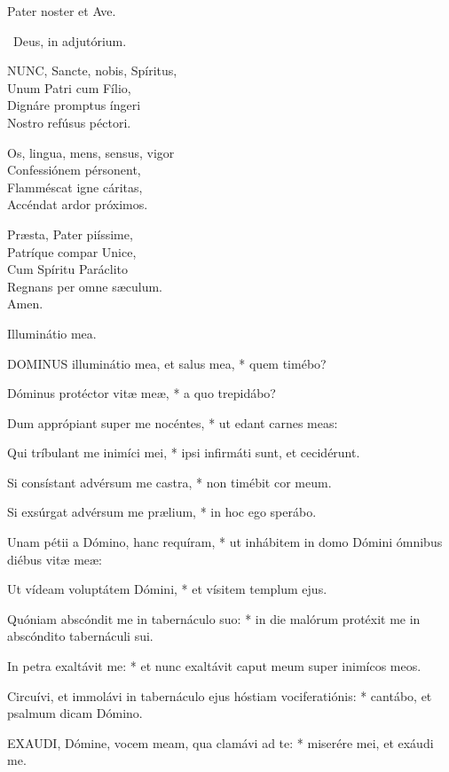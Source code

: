 Pater noster et Ave.

\V\ Deus, in adjutórium.


\lettrine[lines=2]{N}{UNC}, Sancte, nobis, Spíritus,\\
Unum Patri cum Fílio,\\
Dignáre promptus íngeri\\
Nostro refúsus péctori.

Os, lingua, mens, sensus, vigor\\
Confessiónem pérsonent,\\
Flamméscat igne cáritas,\\
Accéndat ardor próximos.

Præsta, Pater piíssime,\\
Patríque compar Unice,\\
Cum Spíritu Paráclito\\
Regnans per omne sæculum.\\
Amen.

 Illuminátio mea.


\lettrine[lines=2]{D}{OMINUS} illuminátio mea, et salus mea, * quem timébo?

Dóminus protéctor vitæ meæ, * a quo trepidábo?

Dum apprópiant super me nocéntes, * ut edant carnes meas:

Qui tríbulant me inimíci mei, * ipsi infirmáti sunt, et cecidérunt.

Si consístant advérsum me castra, * non timébit cor meum.

Si exsúrgat advérsum me prælium, * in hoc ego sperábo.

Unam pétii a Dómino, hanc requíram, * ut inhábitem in domo Dómini ómnibus diébus vitæ meæ:

Ut vídeam voluptátem Dómini, * et vísitem templum ejus.

Quóniam abscóndit me in tabernáculo suo: * in die malórum protéxit me in abscóndito tabernáculi sui.

In petra exaltávit me: * et nunc exaltávit caput meum super inimícos meos.

Circuívi, et immolávi in tabernáculo ejus hóstiam vociferatiónis: * cantábo, et psalmum dicam Dómino.


\lettrine[lines=2]{E}{XAUDI}, Dómine, vocem meam, qua clamávi ad te: * miserére mei, et exáudi me.

